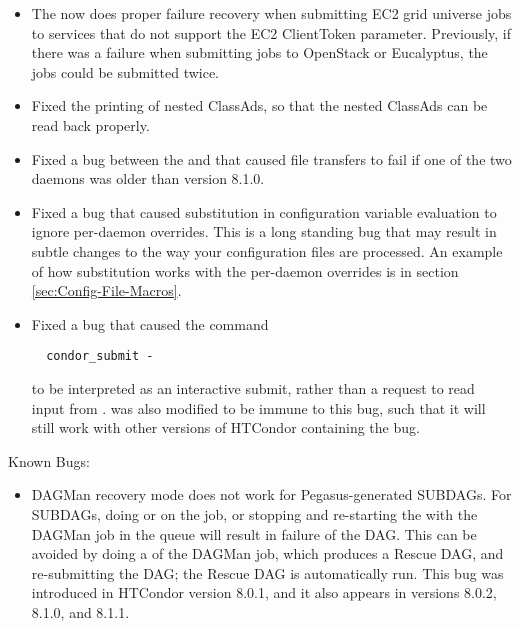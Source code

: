 \begin{itemize}

\item The  now does proper failure recovery when
submitting EC2 grid universe jobs to services that do not support 
the EC2 ClientToken parameter.
Previously, if there was a failure when submitting jobs to OpenStack
or Eucalyptus, the jobs could be submitted twice.

\item Fixed the printing of nested ClassAds, so that the nested ClassAds
can be read back properly.

\item Fixed a bug between the  and 
that caused file transfers to fail if one of the two daemons was older
than version 8.1.0.

\item Fixed a bug that caused substitution in configuration variable
evaluation to ignore per-daemon overrides. 
This is a long standing bug that may result in subtle changes
to the way your configuration files are processed.
An example of how substitution works with the per-daemon overrides
is in section \ref{sec:Config-File-Macros}.

\item Fixed a bug that caused the command
\begin{verbatim}
  condor_submit -
\end{verbatim}
to be interpreted as an interactive submit,
rather than a request to read input from .
 was also modified to be immune to this bug,
such that it will still work with other versions of HTCondor containing
the bug.

\end{itemize}

\noindent Known Bugs:

\begin{itemize}
\item DAGMan recovery mode does not work for Pegasus-generated SUBDAGs.
For SUBDAGs, doing  or  on
the  job, or stopping and re-starting the
 with the DAGMan
job in the queue will result in failure of the DAG.  This can be
avoided by doing a  of the DAGMan job, which produces a Rescue
DAG, and re-submitting the DAG; the Rescue DAG is automatically run.
This bug was introduced in HTCondor version 8.0.1, and it also appears
in versions 8.0.2, 8.1.0, and 8.1.1.

\end{itemize}

